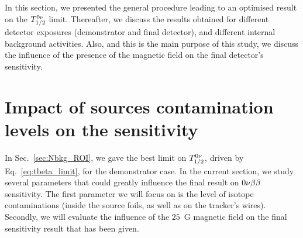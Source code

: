 In this section, we presented the general procedure leading to an optimised result on the $T_{1/2}^{0\nu}$ limit.
Thereafter, we discuss the results obtained for different detector exposures (demonstrator and final detector), and different internal background activities.
Also, and this is the main purpose of this study, we discuss the influence of the presence of the magnetic field on the final detector's sensitivity.


\section{Impact of sources contamination levels on the sensitivity}
\label{sec:demonstrator_sensitivity}

In Sec.~\ref{sec:Nbkg_ROI}, we gave the best limit on $T_{1/2}^{0\nu}$, driven by Eq.~\eqref{eq:tbeta_limit}, for the demonstrator case.
In the current section, we study several parameters that could greatly influence the final result on $0\nu\beta\beta$ sensitivity.
The first parameter we will focus on is the level of isotope contaminations (inside the source foils, as well as on the tracker's wires).
Secondly, we will evaluate the influence of the $25$~G magnetic field on the final sensitivity result that has been given.

